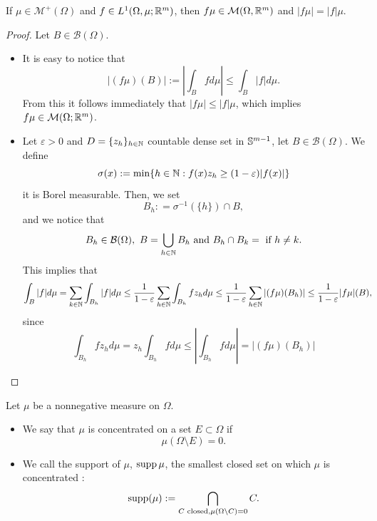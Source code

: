 \begin{lemma}
If $\mu \in \mathcal{M}^+(\Omega)$ and $f\in L^1(\Omega,\mu;\R^m)$, then $f\mu \in \mathcal{M}(\Omega,\R^m)$ and $|f\mu| = |f|\mu$.
\end{lemma}
\begin{proof}
Let $B \in \mathcal{B}(\Omega)$.
\begin{itemize}
\item It is easy to notice that
\begin{equation*}
|(f \mu)(B)| := | \int_B f d\mu| \leq \int_B |f| d\mu.
\end{equation*} 
From this it follows immediately that $|f\mu| \leq |f| \mu$, which implies $f\mu \in \mathcal{M}(\Omega;\R^m)$. 
\item Let $\varepsilon > 0$ and $D = \{z_h\}_{h\in\N}$ countable dense set in
$\S^{m-1}$, let $B \in \mathcal{B}(\Omega)$. We define 
\[
\sigma(x) := \min \{h\in \N: f(x) z_h \geq (1-\varepsilon)|f(x)|\}
\]
it is Borel measurable. Then, we set $$B_h : = \sigma^{-1}(\{h\}) \cap B,$$ 
and we notice that 
\begin{equation*}
B_{h} \in \mathcal{B}(\Omega), \ B = \bigcup_{h\in\N} B_h \text{ and } B_h \cap B_k = \empty \text{ if } h\neq k. 
\end{equation*}
This implies that 
\[
\begin{aligned}
\int_B |f| d\mu 
&= \sum_{k\in\N} \int_{B_h} |f| d\mu 
\leq \frac{1}{1-\varepsilon} \sum_{h\in\N} \int_{B_h} f z_h d\mu 
\leq \frac{1}{1-\varepsilon} \sum_{h\in\N} |(f \mu)(B_h)|  
\leq \frac{1}{1-\varepsilon}  |f \mu|(B),
\end{aligned}
\]
since 
\[
\int_{B_h} f z_h d\mu 
= z_h \int_{B_h} f d\mu 
\leq \left|\int_{B_h} f d\mu \right|
= |(f \mu)(B_h)|  
\]
\end{itemize}
\end{proof}

\begin{definition}
Let $\mu$ be a nonnegative measure on $\Omega$.
\begin{itemize}
\item We say that $\mu$ is concentrated on a set $E \subset \Omega$ if  
\[
\mu(\Omega \setminus E) = 0.
\]
\item We call the support of $\mu$, $\supp \mu$, the smallest closed set on
which $\mu$ is concentrated :
\[
\supp (\mu) := \bigcap_{C \text{ closed}, \mu (\Omega\setminus C) = 0} C.
\]
\end{itemize}
\end{definition}

